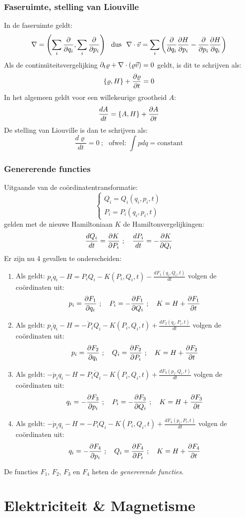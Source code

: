 \subsection{Faseruimte, stelling van Liouville}
In de faseruimte geldt:
\[
\nabla=\left(\sum_i\frac{\partial }{\partial q_i},\sum_i\frac{\partial }{\partial p_i}\right)\mbox{~~dus~~}
\nabla\cdot\vec{v}=\sum_i\left(\frac{\partial }{\partial q_i}\frac{\partial H}{\partial p_i}-\frac{\partial }{\partial p_i}\frac{\partial H}{\partial q_i}\right)
\]
Als de continu\"{\i}teitsvergelijking $\partial_t\varrho+\nabla\cdot(\varrho\vec{v})=0$ geldt,
is dit te schrijven als:
\[
\{\varrho,H\}+\frac{\partial \varrho}{\partial t}=0
\]
In het algemeen geldt voor een willekeurige grootheid $A$:
\[
\frac{dA}{dt}=\{A,H\}+\frac{\partial A}{\partial t}
\]
De stelling van Liouville is dan te schrijven als:
\[
\frac{d\varrho}{dt}=0~;~~~\mbox{ofwel:~}\int pdq=\mbox{constant}
\]
\subsection{Genererende functies}
Uitgaande van de co\"ordinatentransformatie:
\[
\left\{\begin{array}{l}
Q_i=Q_i(q_i,p_i,t)\\
P_i=P_i(q_i,p_i,t)
\end{array}\right.
\]
gelden met de nieuwe Hamiltoniaan $K$ de Hamiltonvergelijkingen:
\[
\frac{dQ_i}{dt}=\frac{\partial K}{\partial P_i}~;~~~\frac{dP_i}{dt}=-\frac{\partial K}{\partial Q_i}
\]
Er zijn nu 4 gevallen te onderscheiden:
\begin{enumerate}
\item Als geldt: $\displaystyle p_i\dot{q}_i-H=P_iQ_i-K(P_i,Q_i,t)-\frac{dF_1(q_i,Q_i,t)}{dt}$
volgen de co\"ordinaten uit:
\[
p_i=\frac{\partial F_1}{\partial q_i}~;~~~P_i=-\frac{\partial F_1}{\partial Q_i}~;~~~K=H+\frac{\partial F_1}{\partial t}
\]
\item Als geldt: $\displaystyle p_i\dot{q}_i-H=-\dot{P}_iQ_i-K(P_i,Q_i,t)+\frac{dF_2(q_i,P_i,t)}{dt}$
volgen de co\"ordinaten uit:
\[
p_i=\frac{\partial F_2}{\partial q_i}~;~~~Q_i=\frac{\partial F_2}{\partial P_i}~;~~~K=H+\frac{\partial F_2}{\partial t}
\]
\item Als geldt: $\displaystyle-\dot{p}_iq_i-H=P_i\dot{Q}_i-K(P_i,Q_i,t)+\frac{dF_3(p_i,Q_i,t)}{dt}$
volgen de co\"ordinaten uit:
\[
q_i=-\frac{\partial F_3}{\partial p_i}~;~~~P_i=-\frac{\partial F_3}{\partial Q_i}~;~~~K=H+\frac{\partial F_3}{\partial t}
\]
\item Als geldt: $\displaystyle-\dot{p}_iq_i-H=-P_iQ_i-K(P_i,Q_i,t)+\frac{dF_4(p_i,P_i,t)}{dt}$
volgen de co\"ordinaten uit:
\[
q_i=-\frac{\partial F_4}{\partial p_i}~;~~~Q_i=\frac{\partial F_4}{\partial P_i}~;~~~K=H+\frac{\partial F_4}{\partial t}
\]
\end{enumerate}
De functies $F_1$, $F_2$, $F_3$ en $F_4$ heten de {\it genererende functies}.

\chapter{Elektriciteit \& Magnetisme}
